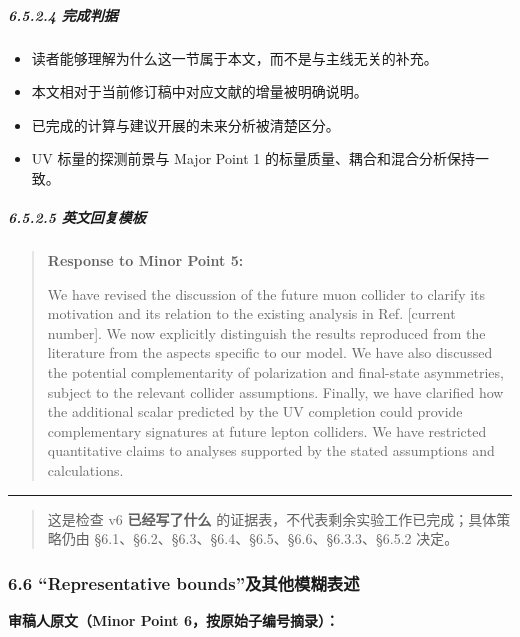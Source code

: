 \documentclass[
]{article}
\providecommand{\tightlist}{%
  \setlength{\itemsep}{0pt}\setlength{\parskip}{0pt}}
\begin{document}
\subparagraph{6.5.2.4 完成判据}\label{ux5b8cux6210ux5224ux636e-3}

\begin{itemize}
\tightlist
\item
  读者能够理解为什么这一节属于本文，而不是与主线无关的补充。
\item
  本文相对于当前修订稿中对应文献的增量被明确说明。
\item
  已完成的计算与建议开展的未来分析被清楚区分。
\item
  UV 标量的探测前景与 Major Point 1 的标量质量、耦合和混合分析保持一致。
\end{itemize}

\subparagraph{6.5.2.5
英文回复模板}\label{ux82f1ux6587ux56deux590dux6a21ux677f-3}

\begin{quote}
\textbf{Response to Minor Point 5:}

We have revised the discussion of the future muon collider to clarify
its motivation and its relation to the existing analysis in Ref.
{[}current number{]}. We now explicitly distinguish the results
reproduced from the literature from the aspects specific to our model.
We have also discussed the potential complementarity of polarization and
final-state asymmetries, subject to the relevant collider assumptions.
Finally, we have clarified how the additional scalar predicted by the UV
completion could provide complementary signatures at future lepton
colliders. We have restricted quantitative claims to analyses supported
by the stated assumptions and calculations.
\end{quote}

\begin{center}\rule{0.5\linewidth}{0.5pt}\end{center}

\begin{quote}
这是检查 v6 \textbf{已经写了什么}
的证据表，不代表剩余实验工作已完成；具体策略仍由
§6.1、§6.2、§6.3、§6.4、§6.5、§6.6、§6.3.3、§6.5.2 决定。
\end{quote}

\subsubsection{6.6 ``Representative
bounds''及其他模糊表述}\label{representative-boundsux53caux5176ux4ed6ux6a21ux7ccaux8868ux8ff0}

\textbf{审稿人原文（Minor Point 6，按原始子编号摘录）：}
\end{document}
